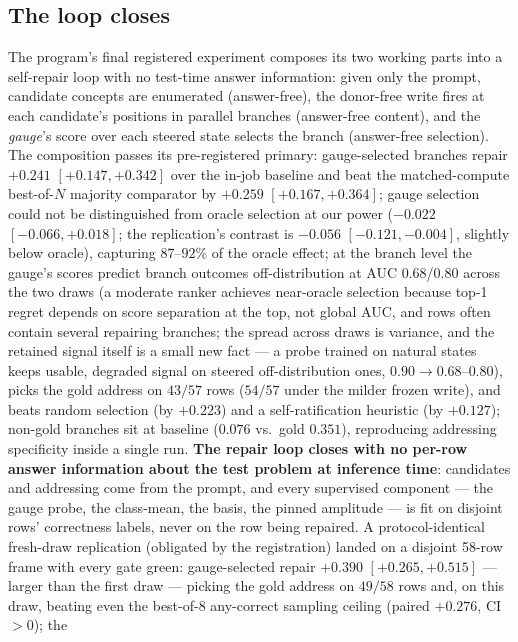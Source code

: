 \documentclass{article} %
\begin{document}
\subsection{The loop closes}\label{sec:loop}

The program's final registered experiment composes its two working
parts into a self-repair loop with no test-time answer information:
given
only the prompt, candidate concepts are enumerated (answer-free), the
donor-free write fires at each candidate's positions in parallel
branches (answer-free content), and the \emph{gauge}'s score over each
steered state selects the branch (answer-free selection). The
composition passes its pre-registered primary: gauge-selected branches
repair $+0.241$ $[+0.147, +0.342]$ over the in-job baseline and beat
the matched-compute best-of-$N$ majority comparator by $+0.259$
$[+0.167, +0.364]$; gauge selection could not be distinguished from oracle selection at
our power ($-0.022$ $[-0.066, +0.018]$; the replication's contrast is
$-0.056$ $[-0.121, -0.004]$, slightly below oracle), capturing
$87$--$92\%$ of the oracle effect; at the branch level the gauge's
scores predict branch outcomes off-distribution at AUC $0.68$/$0.80$
across the two draws (a moderate ranker achieves near-oracle
selection because top-1 regret depends on score separation at the
top, not global AUC, and rows often contain several repairing
branches; the spread across draws is variance, and the retained
signal itself is a small new fact --- a probe trained on natural
states keeps usable, degraded signal on steered off-distribution
ones, $0.90 \to 0.68$--$0.80$),
picks the gold address on $43/57$ rows ($54/57$ under the milder
frozen write), and beats random selection (by $+0.223$) and a
self-ratification heuristic (by $+0.127$); non-gold branches sit at
baseline ($0.076$ vs.\ gold $0.351$), reproducing addressing
specificity inside a single run. \textbf{The repair loop closes with no per-row answer information
about the test problem at inference time}: candidates and addressing
come from the prompt, and every supervised component --- the gauge
probe, the class-mean, the basis, the pinned amplitude --- is fit on
disjoint rows' correctness labels, never on the row being repaired. A protocol-identical
fresh-draw replication (obligated by the registration) landed on a
disjoint 58-row frame with every gate green: gauge-selected repair
$+0.390$ $[+0.265, +0.515]$ --- larger than the first draw --- picking
the gold address on $49/58$ rows and, on this draw, beating even the
best-of-8 any-correct sampling ceiling (paired $+0.276$, CI $>0$); the
\end{document}
